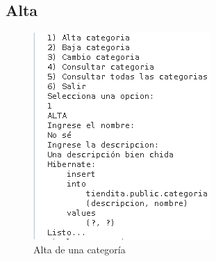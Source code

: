 \documentclass[a4paper,12pt]{article}
\begin{document}
\subsection{Alta}
\begin{figure}[H]
\begin{center}
 \includegraphics[width=\textwidth]{alta.png}
 \caption{Alta de una categoría}
 \label{fig:alta}
\end{center}
\end{figure}
\end{document}
